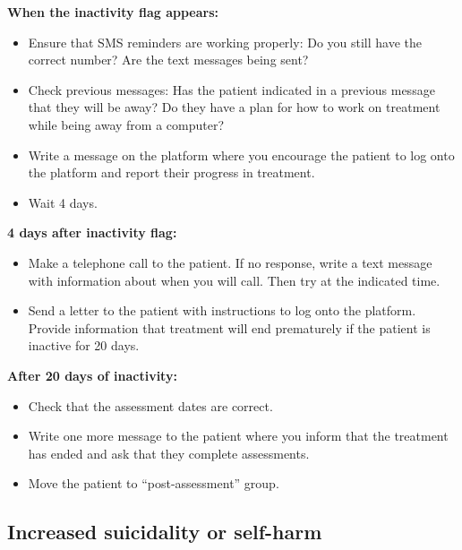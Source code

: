 \documentclass[]{book}
\providecommand{\tightlist}{%
  \setlength{\itemsep}{0pt}\setlength{\parskip}{0pt}}
\theoremstyle{definition}
\theoremstyle{definition}
\theoremstyle{definition}
\theoremstyle{remark}
\begin{document}
\textbf{When the inactivity flag appears:}

\begin{itemize}
\tightlist
\item
  Ensure that SMS reminders are working properly: Do you still have the
  correct number? Are the text messages being sent?\\
\item
  Check previous messages: Has the patient indicated in a previous
  message that they will be away? Do they have a plan for how to work on
  treatment while being away from a computer?\\
\item
  Write a message on the platform where you encourage the patient to log
  onto the platform and report their progress in treatment.\\
\item
  Wait 4 days.
\end{itemize}

\textbf{4 days after inactivity flag:}

\begin{itemize}
\tightlist
\item
  Make a telephone call to the patient. If no response, write a text
  message with information about when you will call. Then try at the
  indicated time.\\
\item
  Send a letter to the patient with instructions to log onto the
  platform. Provide information that treatment will end prematurely if
  the patient is inactive for 20 days.
\end{itemize}

\textbf{After 20 days of inactivity:}

\begin{itemize}
\tightlist
\item
  Check that the assessment dates are correct.\\
\item
  Write one more message to the patient where you inform that the
  treatment has ended and ask that they complete assessments.\\
\item
  Move the patient to ``post-assessment'' group.
\end{itemize}

\hypertarget{increased-suicidality-or-self-harm}{%
\subsection{Increased suicidality or
self-harm}\label{increased-suicidality-or-self-harm}}
\end{document}
